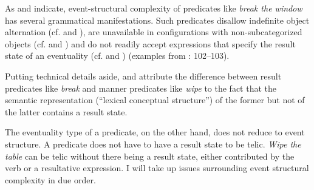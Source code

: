 \documentclass[output=paper,colorlinks,citecolor=brown]{langscibook}
\begin{document}
As \citeauthor{Levin.RappaportHovav1995} and \citeauthor{Rappaport.Hovav.Levin1998} indicate, event-structural complexity of %
predicates like \textit{break the window} has several grammatical manifestations. Such predicates disallow indefinite object alternation (cf.  and %
), are unavailable in configurations with non-subcategorized objects (cf.  and %
) and do not readily accept expressions that specify the result state of an eventuality (cf.  and %
) (examples from \citealt{Rappaport.Hovav.Levin1998}: 102--103). 

\ea\label{ex:tatevosov:new1}
\label{ex:tatevosov:new1a}
\label{ex:tatevosov:new1b}
\z 
\z 

\ea\label{ex:tatevosov:new2}
\label{ex:tatevosov:new2a}
\label{ex:tatevosov:new2b}
\z 
\z 

\ea\label{ex:tatevosov:new3}
\label{ex:tatevosov:new3a}
\label{ex:tatevosov:new3b}
\z 
\z 

\noindent Putting technical details aside, \citeauthor{Levin.RappaportHovav1995} and \citeauthor{Rappaport.Hovav.Levin1998} attribute the difference between result predicates like \textit{break} and manner predicates like \textit{wipe} to the fact that the semantic representation (``lexical conceptual structure'') of the former but not of the latter contains a result state. %

The eventuality type of a predicate, on the other hand, does not reduce to event structure. A predicate does not have to have a result state to be telic. \textit{Wipe the table} can be telic without there being a result state, either contributed by the verb or a resultative expression. I will take up issues surrounding event structural complexity in %
due order. 
\end{document}
